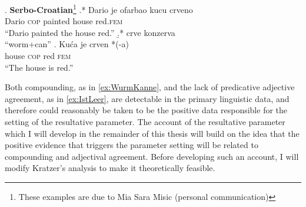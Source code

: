 \documentclass[MilwayThesis]{subfiles}
\begin{document}
\ex. \textbf{Serbo-Croatian}\footnote{These examples are due to Mia Sara Misic (personal communication)} 
\ag.* Dario je ofarbao kucu crveno\\
Dario \textsc{cop} painted house red.\textsc{fem}\\
``Dario painted the house red.''
\b.* crve konzerva\\
``worm+can''
\cg. Ku\'ca je crven *(-a)\\
house \textsc{cop} red \textsc{fem}\\
``The house is red.''

Both compounding, as in \cref{ex:WurmKanne}, and the lack of predicative adjective agreement, as in \cref{ex:IstLeer}, are detectable in the primary linguistic data, and therefore could reasonably be taken to be the positive data responsible for the setting of the resultative parameter.
The account of the resultative parameter which I will develop in the remainder of this thesis will build on the idea that the positive evidence that triggers the parameter setting will be related to compounding and adjectival agreement.
Before developing such an account, I will modify Kratzer's analysis to make it theoretically feasible.
\end{document}
